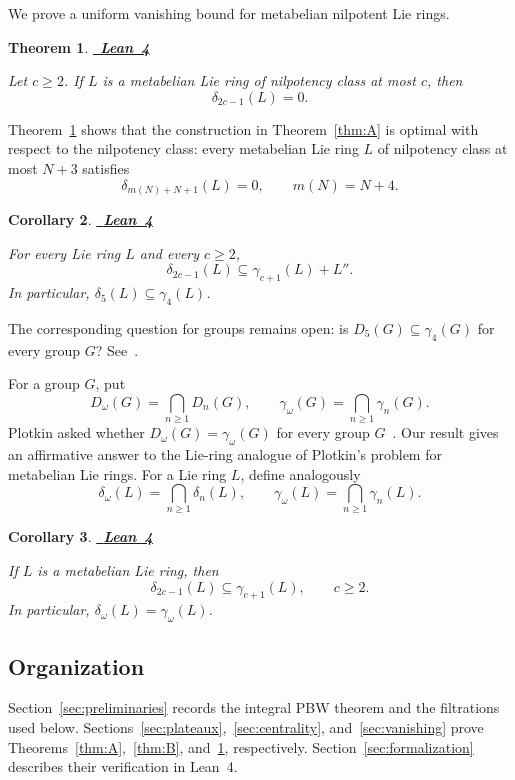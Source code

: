 \documentclass[a4paper,11pt,reqno]{amsart}
\newtheorem{maintheorem}{Theorem}
\newtheorem{maincorollary}[maintheorem]{Corollary}
\theoremstyle{definition}
\newcommand{\leanrepository}{%
  https://github.com/TimmPeterson/lie-algebras/blob/main}
\newcommand{\leanproof}[1]{%
  \leavevmode\unskip\nobreak\hfill
  \mbox{\href{#1}{\normalfont\sffamily\bfseries\footnotesize
    \textcolor{leanblue}{Lean 4}}}%
  \par\nobreak\smallskip\noindent\ignorespaces
}
\begin{document}
We prove a uniform vanishing bound for metabelian nilpotent Lie rings.

\begin{maintheorem}\label{thm:C}
\leanproof{\leanrepository/LieRings/Publication/Results.lean\#L57-L65}
Let $c\geq2$.  If $L$ is a metabelian Lie ring of nilpotency class at most
$c$, then
\[
                              \delta_{2c-1}(L)=0.
\]
\end{maintheorem}

Theorem~\ref{thm:C} shows that the construction in Theorem~\ref{thm:A} is
optimal with respect to the nilpotency class: every metabelian Lie ring
$L$ of nilpotency class at most $N+3$ satisfies
\[
             \delta_{m(N)+N+1}(L)=0,
             \qquad m(N)=N+4.
\]

\begin{maincorollary}\label{cor:D}
\leanproof{\leanrepository/LieRings/Publication/Results.lean\#L67-L77}
For every Lie ring $L$ and every $c\geq2$,
\[
              \delta_{2c-1}(L)\subseteq\gamma_{c+1}(L)+L''.
\]
In particular, $\delta_5(L)\subseteq\gamma_4(L)$.
\end{maincorollary}

The corresponding question for groups remains open: is
$D_5(G)\subseteq\gamma_4(G)$ for every group $G$?
See~\cite[Problem~20.84]{KourovkaNotebook20}.

For a group $G$, put
\[
 D_\omega(G)=\bigcap_{n\geq1}D_n(G),
 \qquad
 \gamma_\omega(G)=\bigcap_{n\geq1}\gamma_n(G).
\]
Plotkin asked whether $D_\omega(G)=\gamma_\omega(G)$ for every group
$G$~\cite{Plotkin1973}.  Our result gives an affirmative answer to the
Lie-ring analogue of Plotkin's problem for metabelian Lie rings.  For a
Lie ring $L$, define analogously
\[
 \delta_\omega(L)=\bigcap_{n\geq1}\delta_n(L),
 \qquad
 \gamma_\omega(L)=\bigcap_{n\geq1}\gamma_n(L).
\]

\begin{maincorollary}\label{cor:E}
\leanproof{\leanrepository/LieRings/Publication/Results.lean\#L79-L94}
If $L$ is a metabelian Lie ring, then
\[
              \delta_{2c-1}(L)\subseteq\gamma_{c+1}(L),
              \qquad c\geq2.
\]
In particular, $\delta_\omega(L)=\gamma_\omega(L)$.
\end{maincorollary}

\subsection{Organization}

Section~\ref{sec:preliminaries} records the integral PBW theorem and the
filtrations used below.  Sections~\ref{sec:plateaux},~\ref{sec:centrality},
and~\ref{sec:vanishing} prove
Theorems~\ref{thm:A},~\ref{thm:B}, and~\ref{thm:C}, respectively.
Section~\ref{sec:formalization} describes their verification in Lean~4.
\end{document}
